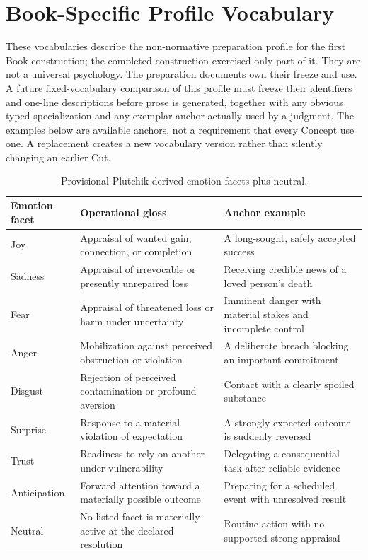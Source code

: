 \documentclass[11pt,a4paper]{article}
\begin{document}
\appendix

\section{Book-Specific Profile Vocabulary}
\label{app:book-vocabulary}

These vocabularies describe the non-normative preparation profile for the first Book construction;
the completed construction exercised only part of it. They are not a universal
psychology. The preparation documents own their
freeze and use. A future fixed-vocabulary comparison of this profile must freeze their identifiers and
one-line descriptions before prose is generated, together with any obvious
typed specialization and any exemplar anchor actually used by a judgment. The
examples below are available anchors, not a requirement that every Concept use
one. A replacement creates a new vocabulary version rather than silently
changing an earlier Cut.

\begin{table}[H]
\centering
\scriptsize
\begin{tabularx}{\textwidth}{@{}p{}p{}Y@{}}
\toprule
Emotion facet & Operational gloss & Anchor example \\
\midrule
Joy & Appraisal of wanted gain, connection, or completion & A long-sought, safely accepted success \\
Sadness & Appraisal of irrevocable or presently unrepaired loss & Receiving credible news of a loved person's death \\
Fear & Appraisal of threatened loss or harm under uncertainty & Imminent danger with material stakes and incomplete control \\
Anger & Mobilization against perceived obstruction or violation & A deliberate breach blocking an important commitment \\
Disgust & Rejection of perceived contamination or profound aversion & Contact with a clearly spoiled substance \\
Surprise & Response to a material violation of expectation & A strongly expected outcome is suddenly reversed \\
Trust & Readiness to rely on another under vulnerability & Delegating a consequential task after reliable evidence \\
Anticipation & Forward attention toward a materially possible outcome & Preparing for a scheduled event with unresolved result \\
Neutral & No listed facet is materially active at the declared resolution & Routine action with no supported strong appraisal \\
\bottomrule
\end{tabularx}
\caption{Provisional Plutchik-derived emotion facets plus neutral.}
\label{tab:emotion-vocabulary}
\end{table}
\end{document}
